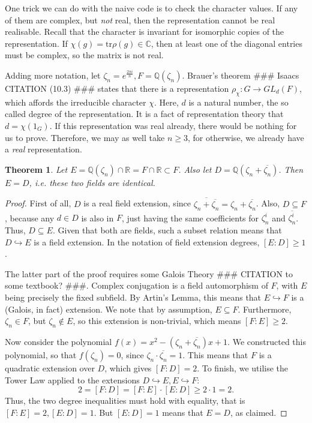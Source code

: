 \documentclass[11pt]{article}
\newtheorem{theorem}{Theorem}[section]
\begin{document}
One trick we can do with the naive code is to check the character values. If any of them are
complex, but \textit{not} real, then the representation cannot be real realisable. Recall that
the character is invariant for isomorphic copies of the representation. If
$\chi(g) = \text{tr}\rho(g) \in \mathbb{C}$, then at least one of the diagonal entries
must be complex, so the matrix is not real.

Adding more notation, let $\zeta_n = e^{\frac{2\pi i}{n}}, F=\mathbb{Q}(\zeta_n)$.
Brauer's theorem \#\#\# Isaacs CITATION (10.3) \#\#\# states that there is a
representation $\rho_\chi: G \rightarrow GL_d(F)$, which affords the irreducible character $\chi$.
Here, $d$ is a natural number, the so called degree of the representation.
It is a fact of representation theory that $d = \chi(1_G)$.
If this representation was real already, there would be nothing for us to prove. Therefore, we may
as well take $n \geq 3$, for otherwise, we already have a \textit{real} representation.

\begin{theorem}
  Let $E = \mathbb{Q}(\zeta_n) \cap \mathbb{R} = F \cap \mathbb{R} \subset F$.
  Also let $D = \mathbb{Q}(\zeta_n + \overline{\zeta_n})$.
  Then $E = D$, i.e. these two fields are identical.
\end{theorem}
\begin{proof}
  First of all, $D$ is a real field extension, since $\overline{\zeta_n + \overline{\zeta_n}} = \zeta_n + \overline{\zeta_n}$.
  Also, $D \subseteq F$, because any $d \in D$ is also in $F$, just having the same coefficients for $\zeta_n^i$ and $\overline{\zeta_n^i}$.
  Thus, $D \subseteq E$. Given that both are fields, such a subset relation means that $D \hookrightarrow E$ is a field extension.
  In the notation of field extension degrees, $[E:D] \geq 1$.

  The latter part of the proof requires some Galois Theory \#\#\# CITATION to some textbook? \#\#\#.
  Complex conjugation is a field automorphism of $F$, with $E$ being precisely the fixed subfield.
  By Artin's Lemma, this means that $E \hookrightarrow F$ is a (Galois, in fact) extension.
  We note that by assumption, $E \subseteq F$. Furthermore, $\zeta_n \in F$, but $\zeta_n \notin E$,
  so this extension is non-trivial, which means $[F:E] \geq 2$.

  Now consider the polynomial $f(x) = x^2 - (\zeta_n + \overline{\zeta_n})x + 1$. We constructed this
  polynomial, so that $f(\zeta_n) = 0$, since $\zeta_n \cdot \overline{\zeta_n} = 1$. This means
  that $F$ is a quadratic extension over $D$, which gives $[F:D] = 2$. To finish, we utilise the Tower Law
  applied to the extensions $D \hookrightarrow E, E \hookrightarrow F$:
  \[2 = [F:D] = [F:E] \cdot [E:D] \geq 2 \cdot 1 = 2.\]
  Thus, the two degree inequalities must hold with equality, that is $[F:E] = 2, [E:D] = 1$.
  But $[E:D] = 1$ means that $E = D$, as claimed.
\end{proof}
\end{document}
